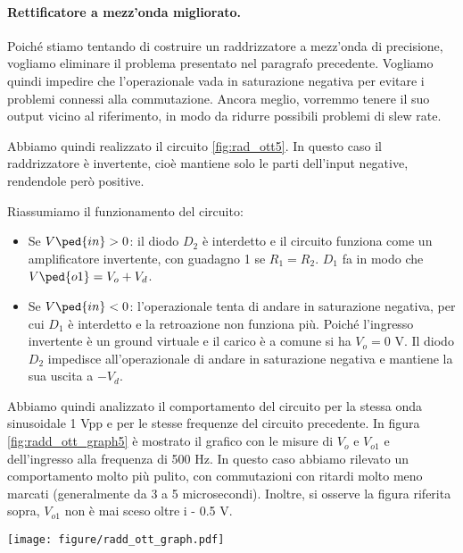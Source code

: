 \paragraph{Rettificatore a mezz'onda migliorato.}

Poiché stiamo tentando di costruire un raddrizzatore a mezz'onda di precisione, vogliamo eliminare
il problema presentato nel paragrafo precedente. Vogliamo quindi impedire che l'operazionale vada
in saturazione negativa per evitare i problemi connessi alla commutazione. Ancora meglio, vorremmo
tenere il suo output vicino al riferimento, in modo da ridurre possibili problemi di slew rate.

Abbiamo quindi realizzato il circuito \ref{fig:rad_ott5}. In questo caso il raddrizzatore è invertente,
cioè mantiene solo le parti dell'input negative, rendendole però positive.

Riassumiamo il funzionamento del circuito:

\begin{itemize}
    \item{Se $V\ped{in} > 0$: il diodo $D_2$ è interdetto e il circuito funziona come un amplificatore
        invertente, con guadagno 1 se $R_1 = R_2$. $D_1$ fa in modo che $V\ped{o1} = V_o + V_d$.}
    \item{Se $V\ped{in} < 0$: l'operazionale tenta di andare in saturazione negativa, per cui $D_1$ è
        interdetto e la retroazione non funziona più. Poiché l'ingresso invertente è un ground virtuale
        e il carico è a comune si ha $V_o = 0$ V. Il diodo $D_2$ impedisce all'operazionale di andare in saturazione
        negativa e mantiene la sua uscita a $-V_d$.}
\end{itemize}

Abbiamo quindi analizzato il comportamento del circuito per la stessa onda sinusoidale 1 Vpp e per le stesse
frequenze del circuito precedente. In figura \ref{fig:radd_ott_graph5} è mostrato il grafico con le misure di
$V_o$ e $V_{o1}$ e dell'ingresso alla frequenza di 500 Hz. In questo caso abbiamo rilevato un comportamento
molto più pulito, con commutazioni con ritardi molto meno marcati (generalmente da 3 a 5 microsecondi).
Inoltre, si osserve la figura riferita sopra, $V_{o1}$ non è mai sceso oltre i - 0.5 V.

\begin{SCfigure*}
    \texttt{[image: figure/radd\_ott\_graph.pdf]}
    \caption{Il raddrizzatore ottimizzato produce un output molto più pulito (senza ritardi) mantenendo $V_{o1}$ vicino a 0 V.
	Il raddrizzatore in questo caso mantiene le semionde negative raddrizzandole. $V_{o1}$ è circa 0.5 V più alta di $V_o$,
	come ci si aspetta dalla caduta in polarizzazione diretta del diodo. Il fatto che la curva tratteggiata sia tonda in basso è
	dovuto alla caratteristica del diodo.}
    \label{fig:radd_ott_graph5}
\end{SCfigure*}

